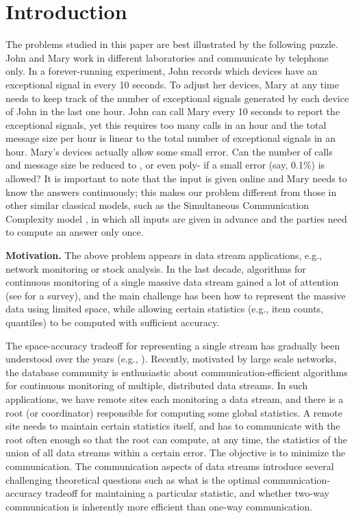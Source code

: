 \documentclass[proceedings]{stacs}
\theoremstyle{definition}\newtheorem{fact}{Fact}
\begin{document}
\section{Introduction}
The problems studied in this paper are best illustrated by the following
puzzle. John and Mary work in different laboratories and communicate by
telephone only.  In a forever-running experiment, John records which
devices have an exceptional signal in every 10 seconds.
To adjust her devices, Mary at any time needs to keep track of the number of
exceptional signals generated by each device of John in the last one hour.
John can call Mary every 10 seconds to report the exceptional signals,
yet this requires too many calls in an hour and the total
message size per hour is linear to
the total number  of exceptional signals in an hour.
Mary's devices actually allow some small error.  Can the number of
calls and message size be
reduced to , or even poly- if a small error (say, 0.1\%)
is allowed?
It is important to note that the input is given online
and Mary needs to know the answers continuously;
this makes our problem different from those in other similar classical
models, such as the
Simultaneous Communication
Complexity model \cite{BabaiGKL04}, in which all inputs
are given in advance and the parties need to
compute an answer only once.

\vspace{0.5ex}
{\bf Motivation.}
The above problem appears in data stream applications, e.g.,
network monitoring or stock analysis.
In the last decade, algorithms for continuous monitoring of a
single  massive data stream gained
a lot of attention (see \cite{Aggarwal06,Muthukrishnan05} for a survey), and
the main challenge has been how to represent the massive data
using limited space, while allowing
certain statistics (e.g., item counts, quantiles)
to be computed with sufficient accuracy.

The space-accuracy tradeoff for representing a single stream
has gradually been
understood over the years (e.g., \cite{AlonMS02,Indyk00,GuhaKS01,DemaineLM02}).
Recently, motivated by large scale networks,
the database community is enthusiastic about
communication-efficient algorithms for
continuous monitoring of
multiple, distributed data streams.
In such applications, we have  remote sites
each monitoring a data stream, and there is a
root (or coordinator) responsible for computing some global
statistics.  A remote site needs to
maintain certain statistics itself, and has to
communicate with the root often enough so that
the root can compute, at any time,
the statistics of the union of all
data streams within a certain error.
The objective is to minimize the communication.
The communication aspects of data streams introduce several challenging
theoretical questions such as
what is the optimal communication-accuracy tradeoff for maintaining a
particular statistic, and whether two-way communication is inherently
more efficient than one-way communication.
\end{document}
